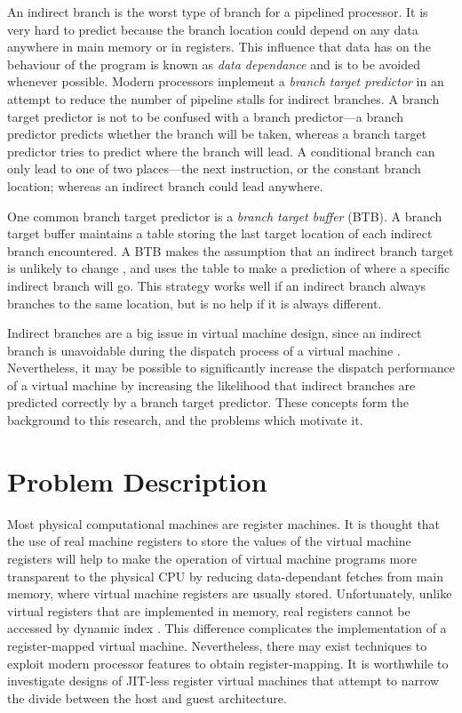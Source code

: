 			An indirect branch is the worst type of branch for a pipelined processor. It is very hard to predict because the branch location could depend on any data anywhere in main memory or in registers. This influence that data has on the behaviour of the program is known as \emph{data dependance} and is to be avoided whenever possible. Modern processors implement a \emph{branch target predictor} in an attempt to reduce the number of pipeline stalls for indirect branches. A branch target predictor is not to be confused with a branch predictor---a branch predictor predicts whether the branch will be taken, whereas a branch target predictor tries to predict where the branch will lead. A conditional branch can only lead to one of two places---the next instruction, or the constant branch location; whereas an indirect branch could lead anywhere.
			
			One common branch target predictor is a \emph{branch target buffer} (BTB). A branch target buffer maintains a table storing the last target location of each indirect branch encountered. A BTB makes the assumption that an indirect branch target is unlikely to change  \citep{yeti}, and uses the table to make a prediction of where a specific indirect branch will go. This strategy works well if an indirect branch always branches to the same location, but is no help if it is always different.
			
			Indirect branches are a big issue in virtual machine design, since an indirect branch is unavoidable during the dispatch process of a virtual machine \citep{structureinterpreters}. Nevertheless, it may be possible to significantly increase the dispatch performance of a virtual machine by increasing the likelihood that indirect branches are predicted correctly by a branch target predictor. These concepts form the background to this research, and the problems which motivate it.
	
	\section{Problem Description}
		Most physical computational machines are register machines. It is thought that the use of real machine registers to store the values of the virtual machine registers will help to make the operation of virtual machine programs more transparent to the physical CPU by reducing data-dependant fetches from main memory, where virtual machine registers are usually stored. Unfortunately, unlike virtual registers that are implemented in memory, real registers cannot be accessed by dynamic index \citep{caseregistervm}. This difference complicates the implementation of a register-mapped virtual machine. Nevertheless, there may exist techniques to exploit modern processor features to obtain register-mapping. It is worthwhile to investigate designs of JIT-less register virtual machines that attempt to narrow the divide between the host and guest architecture.
		
